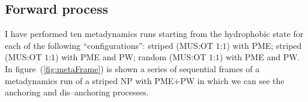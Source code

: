 \subsection{Forward process}
I have performed ten metadynamics runs starting from the hydrophobic state for each of the following 
``configurations'': striped (\ac{MUS}:\ac{OT} $1$:$1$) with \ac{PME}; striped (\ac{MUS}:\ac{OT} $1$:$1$) with 
\ac{PME} and \ac{PW}; random (\ac{MUS}:\ac{OT} $1$:$1$) with \ac{PME} and \ac{PW}. In figure~(\ref{fig:metaFrame}) 
is shown a series of sequential frames of a metadynamics run of a striped \ac{NP} with \ac{PME}$+$\ac{PW} in which 
we can see the anchoring and dis--anchoring processes.
\begin{figure}[t!]
	\centering
		\ %
		\\\medskip%
		\ %
\end{figure}
